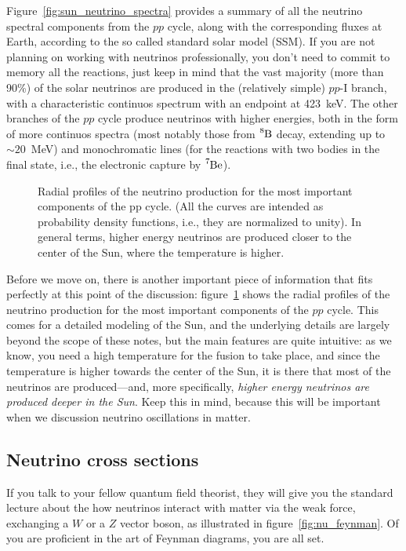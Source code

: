 Figure~\ref{fig:sun_neutrino_spectra} provides a summary of all the neutrino spectral
components from the $pp$ cycle, along with the corresponding fluxes at Earth,
according to the so called standard solar model (SSM).
If you are not planning on working with neutrinos professionally, you don't need
to commit to memory all the reactions, just keep in mind that the vast majority
(more than 90\%) of the solar neutrinos are produced in the (relatively simple)
$pp$-I branch, with a characteristic continuos spectrum with an endpoint at
423~keV. The other branches of the $pp$ cycle produce neutrinos with higher energies,
both in the form of more continuos spectra (most notably those from $\ce{^8B}$
decay, extending up to $\sim 20$~MeV) and monochromatic lines (for the reactions
with two bodies in the final state, i.e., the electronic capture by $\ce{^7Be}$).

\begin{figure}[!htbp]
  
  \caption{Radial profiles of the neutrino production for the most important
  components of the pp cycle. (All the curves are intended as probability density
  functions, i.e., they are normalized to unity). In general terms, higher energy
  neutrinos are produced closer to the center of the Sun, where the temperature
  is higher.}
  \label{fig:sun_neutrino_location}
\end{figure}

Before we move on, there is another important piece of information that fits
perfectly at this point of the discussion: figure~\ref{fig:sun_neutrino_location}
shows the radial profiles of the neutrino production for the most important
components of the $pp$ cycle. This comes for a detailed modeling of the Sun, and
the underlying details are largely beyond the scope of these notes, but the
main features are quite intuitive: as we know, you need a high temperature for the
fusion to take place, and since the temperature is higher towards the center of
the Sun, it is there that most of the neutrinos are produced---and, more
specifically, \emph{higher energy neutrinos are produced deeper in the Sun}.
Keep this in mind, because this will be important when we discussion neutrino
oscillations in matter.


\subsection{Neutrino cross sections}
\label{sec:nu_cross_sections}

If you talk to your fellow quantum field theorist, they will give you the standard
lecture about the how neutrinos interact with matter via the weak force, exchanging
a $W$ or a $Z$ vector boson, as illustrated in figure~\ref{fig:nu_feynman}.
Of you are proficient in the art of Feynman diagrams, you are all set.

